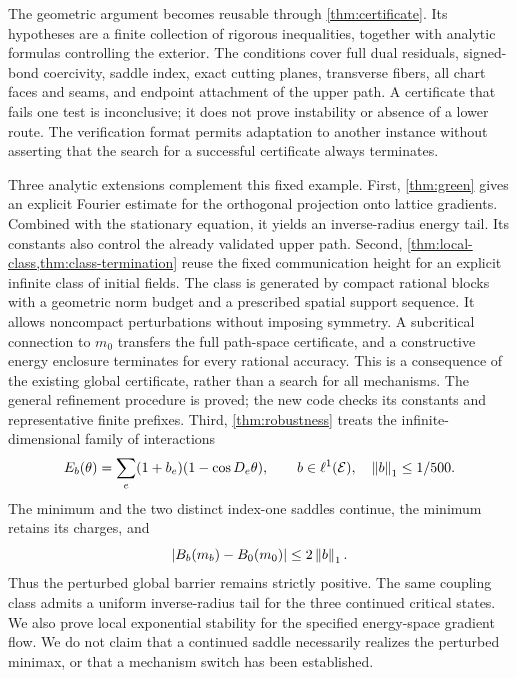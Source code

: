 The geometric argument becomes reusable through \cref{thm:certificate}. Its hypotheses are a finite collection of rigorous inequalities, together with analytic formulas controlling the exterior. The conditions cover full dual residuals, signed-bond coercivity, saddle index, exact cutting planes, transverse fibers, all chart faces and seams, and endpoint attachment of the upper path. A certificate that fails one test is inconclusive; it does not prove instability or absence of a lower route. The verification format permits adaptation to another instance without asserting that the search for a successful certificate always terminates.

Three analytic extensions complement this fixed example. First, \cref{thm:green} gives an explicit Fourier estimate for the orthogonal projection onto lattice gradients. Combined with the stationary equation, it yields an inverse-radius energy tail. Its constants also control the already validated upper path. Second, \cref{thm:local-class,thm:class-termination} reuse the fixed
communication height for an explicit infinite class of initial fields.
The class is generated by compact rational blocks with a geometric
norm budget and a prescribed spatial support sequence. It allows
noncompact perturbations without imposing symmetry. A subcritical
connection to $m_0$ transfers the full path-space certificate, and a
constructive energy enclosure terminates for every rational accuracy.
This is a consequence of the existing global certificate, rather than a
search for all mechanisms. The general refinement procedure is proved;
the new code checks its constants and representative finite prefixes.
Third, \cref{thm:robustness} treats the infinite-dimensional family of interactions
\begin{equation}\label{eq:intro-perturbation}
 E_b(\theta)=\sum_e(1+b_e)(1-\cos D_e\theta),\qquad
 b\in\ell^1(\mathcal E),\quad\left\lVert b\right\rVert_1\le 1/500.
\end{equation}
The minimum and the two distinct index-one saddles continue, the minimum retains its charges, and
\begin{equation}\label{eq:intro-robust}
 |B_b(m_b)-B_0(m_0)|\le2\left\lVert b\right\rVert_1.
\end{equation}
Thus the perturbed global barrier remains strictly positive. The same coupling class admits a uniform inverse-radius tail for the three continued critical states. We also prove local exponential stability for the specified energy-space gradient flow. We do not claim that a continued saddle necessarily realizes the perturbed minimax, or that a mechanism switch has been established.


